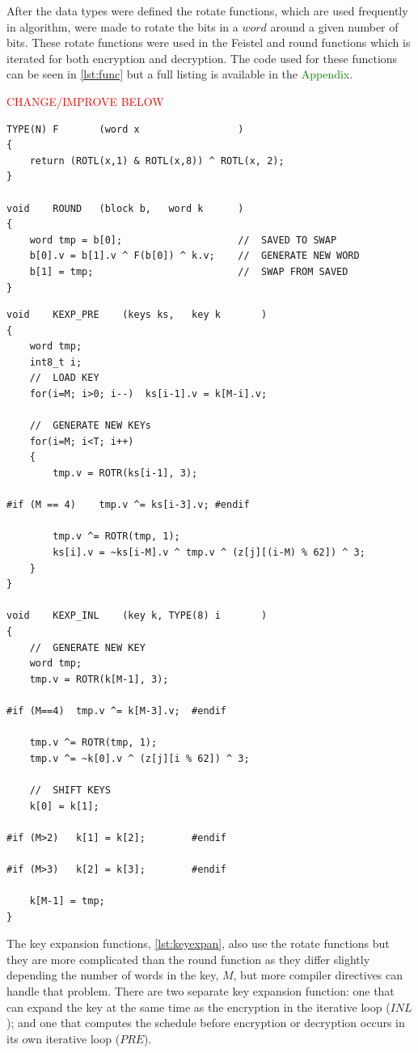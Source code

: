 \documentclass[12pt,twoside,a4paper]{report}
\begin{document}
	After the data types were defined the rotate functions, which are used frequently in algorithm, were made to rotate the bits in a $word$ around a given number of bits. These rotate functions were used in the Feistel and round functions which is iterated for both encryption and decryption. The code used for these functions can be seen in \autoref{lst:func} but a full listing is available in the \textcolor{green}{Appendix}. 
    
	\textcolor{red}{CHANGE/IMPROVE BELOW} 
	
	\begin{minipage}{\linewidth}
	\begin{lstlisting}[label={lst:func},caption={Round and Feistel functions},style=CStyle]
TYPE(N)	F		(word x					)
{
	return (ROTL(x,1) & ROTL(x,8)) ^ ROTL(x, 2);
}

void	ROUND	(block b,	word k		)
{	
	word tmp = b[0];					//	SAVED TO SWAP
	b[0].v = b[1].v ^ F(b[0]) ^ k.v;	//	GENERATE NEW WORD
	b[1] = tmp;							//	SWAP FROM SAVED
}
	\end{lstlisting}
	\end{minipage}
	
	\begin{minipage}{\linewidth}
	\begin{lstlisting}[label={lst:keyexpan},caption={Key Expansion Functions},style=CStyle]
void	KEXP_PRE	(keys ks,	key k		)
{
	word tmp;
	int8_t i;
	//	LOAD KEY
	for(i=M; i>0; i--)	ks[i-1].v = k[M-i].v;
	
	//	GENERATE NEW KEYs
	for(i=M; i<T; i++)
	{
		tmp.v = ROTR(ks[i-1], 3);
		
#if (M == 4)	tmp.v ^= ks[i-3].v;	#endif

		tmp.v ^= ROTR(tmp, 1);
		ks[i].v = ~ks[i-M].v ^ tmp.v ^ (z[j][(i-M) % 62]) ^ 3;
	}
}

void	KEXP_INL	(key k,	TYPE(8) i		)
{
	//	GENERATE NEW KEY	
	word tmp;
	tmp.v = ROTR(k[M-1], 3);
	
#if (M==4)	tmp.v ^= k[M-3].v;	#endif

	tmp.v ^= ROTR(tmp, 1);
	tmp.v ^= ~k[0].v ^ (z[j][i % 62]) ^ 3;
	
	//	SHIFT KEYS
	k[0] = k[1];
	
#if (M>2)	k[1] = k[2];		#endif

#if (M>3)	k[2] = k[3];		#endif

	k[M-1] = tmp;
}
	\end{lstlisting}
	\end{minipage}
	
	The key expansion functions, \autoref{lst:keyexpan}, also use the rotate functions but they are more complicated than the round function as they differ slightly depending the number of words in the key, $M$, but more compiler directives can handle that problem. There are two separate key expansion function: one that can expand the key at the same time as the encryption in the iterative loop ($INL$); and one that computes the schedule before encryption or decryption occurs in its own iterative loop ($PRE$).
    
\end{document}
